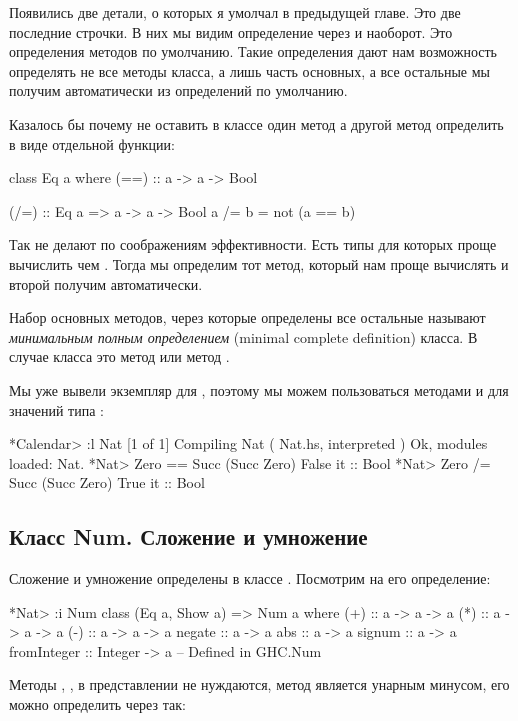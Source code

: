 Появились две детали, о которых я умолчал в предыдущей главе.
Это две последние строчки. В них мы видим определение \In{==}
через \In{/=} и наоборот. Это определения методов по умолчанию.
Такие определения дают нам возможность определять не все методы
класса, а лишь часть основных, а все остальные мы получим 
автоматически из определений по умолчанию. 

Казалось бы почему не оставить в классе  один метод
а другой метод определить в виде отдельной функции:

\begin{code}
class Eq a where
    (==) :: a -> a -> Bool

(/=) :: Eq a => a -> a -> Bool
a /= b = not (a == b)
\end{code}

Так не делают по соображениям эффективности. Есть типы для
которых проще вычислить \In{/=} чем \In{==}. Тогда мы определим
тот метод, который нам проще вычислять и второй получим автоматически.

Набор основных методов, через которые определены все остальные
называют \emph{минимальным полным определением} 
(minimal complete definition) класса. В случае класса 
это метод \In{==}  или метод \In{/=}.

Мы уже вывели экземпляр для , поэтому мы
можем пользоваться методами \In{==} и \In{/=} для значений 
типа  :

\begin{code}
*Calendar> :l Nat
[1 of 1] Compiling Nat              ( Nat.hs, interpreted )
Ok, modules loaded: Nat.
*Nat> Zero == Succ (Succ Zero)
False
it :: Bool
*Nat> Zero /= Succ (Succ Zero)
True
it :: Bool
\end{code}

\subsection{Класс Num. Сложение и умножение}

Сложение и умножение определены в классе  . 
Посмотрим на его определение:

\begin{code}
*Nat> :i Num
class (Eq a, Show a) => Num a where
  (+) :: a -> a -> a
  (*) :: a -> a -> a
  (-) :: a -> a -> a
  negate :: a -> a
  abs :: a -> a
  signum :: a -> a
  fromInteger :: Integer -> a
  	-- Defined in GHC.Num
\end{code}

Методы \In{(+)}, \In{(*)}, \In{(-)} в представлении не 
нуждаются, метод  является унарным минусом,
его можно определить через \In{(-)} так:

